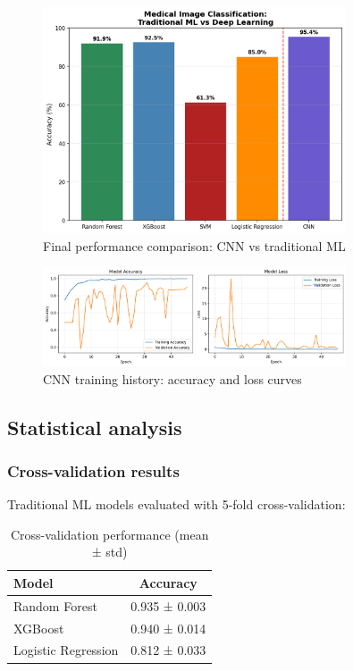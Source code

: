 \documentclass[11pt]{article}
\begin{document}
\begin{figure}[H]
\centering
\includegraphics[width=0.8\textwidth]{images/ml_vs_cnn_comparison}
\caption{Final performance comparison: CNN vs traditional ML}
\label{fig:ml_vs_cnn_comparison}
\end{figure}

\begin{figure}[H]
\centering
\includegraphics[width=0.8\textwidth]{images/nerthus_cnn_training_history}
\caption{CNN training history: accuracy and loss curves}
\label{fig:nerthus_cnn_training_history}
\end{figure}

\subsection{Statistical analysis}

\subsubsection{Cross-validation results}
Traditional ML models evaluated with 5-fold cross-validation:

\begin{table}[H]
\centering
\caption{Cross-validation performance (mean ± std)}
\begin{tabular}{lc}
\toprule
\textbf{Model} & \textbf{Accuracy} \\
\midrule
Random Forest & 0.935 ± 0.003 \\
XGBoost & 0.940 ± 0.014 \\
Logistic Regression & 0.812 ± 0.033 \\
\bottomrule
\end{tabular}
\end{table}
\end{document}
